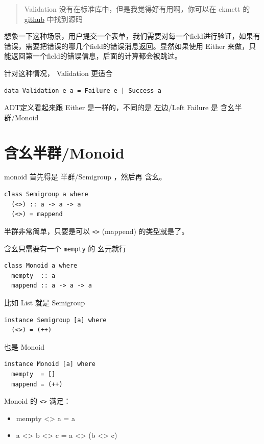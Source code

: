 \documentclass[letterspacing]{tufte-book}
\begin{document}
\begin{quote}
Validation 没有在标准库中，但是我觉得好有用啊，你可以在 ekmett 的 \href{https://github.com/ekmett/either}{github} 中找到源码
\end{quote}

想象一下这种场景，用户提交一个表单，我们需要对每一个field进行验证，如果有错误，需要把错误的哪几个field的错误消息返回。显然如果使用 Either 来做，只能返回第一个field的错误信息，后面的计算都会被跳过。

针对这种情况， Validation 更适合
\lstset{language=haskell,label= ,caption= ,captionpos=b,numbers=none}
\begin{lstlisting}
data Validation e a = Failure e | Success a
\end{lstlisting}

ADT定义看起来跟 Either 是一样的，不同的是 左边/Left Failure 是 含幺半群/Monoid

\section{含幺半群/Monoid}
\label{sec:orgc6d7ebb}
monoid 首先得是 半群/Semigroup ，然后再 含幺。
\lstset{language=haskell,label= ,caption= ,captionpos=b,numbers=none}
\begin{lstlisting}
class Semigroup a where
  (<>) :: a -> a -> a
  (<>) = mappend
\end{lstlisting}

半群非常简单，只要是可以 \texttt{<>} (mappend) 的类型就是了。

含幺只需要有一个 \texttt{mempty} 的 幺元就行
\lstset{language=haskell,label= ,caption= ,captionpos=b,numbers=none}
\begin{lstlisting}
class Monoid a where
  mempty  :: a
  mappend :: a -> a -> a
\end{lstlisting}

比如 List 就是 Semigroup
\lstset{language=haskell,label= ,caption= ,captionpos=b,numbers=none}
\begin{lstlisting}
instance Semigroup [a] where
  (<>) = (++)
\end{lstlisting}
也是 Monoid
\lstset{language=haskell,label= ,caption= ,captionpos=b,numbers=none}
\begin{lstlisting}
instance Monoid [a] where
  mempty  = []
  mappend = (++)
\end{lstlisting}

Monoid 的 \texttt{<>} 满足：
\begin{itemize}
\item mempty <> a = a
\item a <> b <> c = a <> (b <> c)
\end{itemize}
\end{document}
